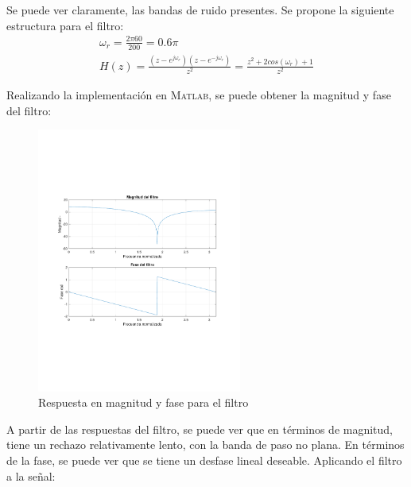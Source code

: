 		Se puede ver claramente, las bandas de ruido presentes. Se propone la siguiente estructura para el filtro:
		\begin{align}
			\omega_{r} = \frac{2\pi 60}{200} = 0.6\pi \\
			H(z) = \frac{(z-e^{j\omega_r})(z-e^{-j\omega_r})}{z^{2}} = \frac{z^{2} + 2cos(\omega_{r}) + 1}{z^{2}}
		\end{align}
		
		Realizando la implementación en \textsc{Matlab}, se puede obtener la magnitud y fase del filtro:
		\begin{figure}[H]
			\center
			\includegraphics[width=0.6\textwidth,clip, trim = {1.9cm 6.8cm 2.3cm 7cm}]{../plots/ecg_poles_0.pdf}
			\caption{Respuesta en magnitud y fase para el filtro}
		\end{figure}
		
		A partir de las respuestas del filtro, se puede ver que en términos de magnitud, tiene un rechazo relativamente lento, con la banda de paso no plana. En términos de la fase, se puede ver que se tiene un desfase lineal deseable. Aplicando el filtro a la señal:
		
